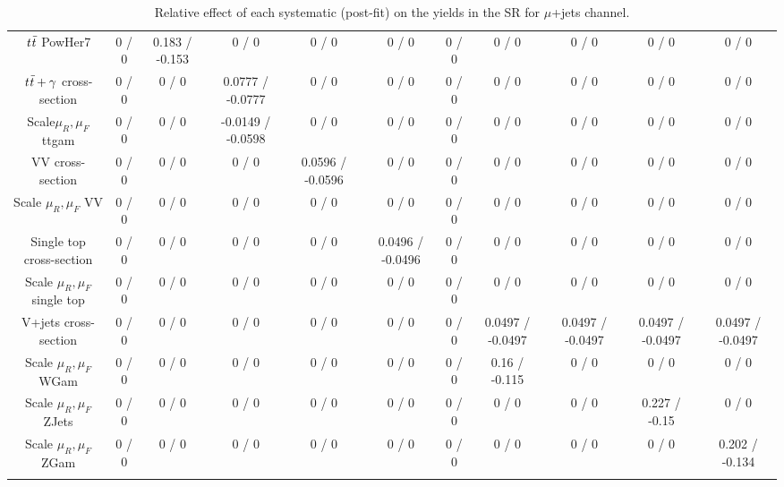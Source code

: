 {\begin{landscape}
\begin{longtable}{@{\extracolsep{\fill}}| *{11}{c|}}
 $ \it{t\bar{t}} $ PowHer7 & 0 / 0 & 0.183 / -0.153 & 0 / 0 & 0 / 0 & 0 / 0 & 0 / 0 & 0 / 0 & 0 / 0 & 0 / 0 & 0 / 0 \\ 
  $\it{t\bar{t}}+\gamma $ cross-section & 0 / 0 & 0 / 0 & 0.0777 / -0.0777 & 0 / 0 & 0 / 0 & 0 / 0 & 0 / 0 & 0 / 0 & 0 / 0 & 0 / 0 \\ 
  Scale$ \mu_{R},\mu_{F}$ ttgam & 0 / 0 & 0 / 0 & -0.0149 / -0.0598 & 0 / 0 & 0 / 0 & 0 / 0 & 0 / 0 & 0 / 0 & 0 / 0 & 0 / 0 \\ 
  VV cross-section & 0 / 0 & 0 / 0 & 0 / 0 & 0.0596 / -0.0596 & 0 / 0 & 0 / 0 & 0 / 0 & 0 / 0 & 0 / 0 & 0 / 0 \\ 
  Scale $\mu_{R},\mu_{F}$ VV & 0 / 0 & 0 / 0 & 0 / 0 & 0 / 0 & 0 / 0 & 0 / 0 & 0 / 0 & 0 / 0 & 0 / 0 & 0 / 0 \\ 
  Single top cross-section & 0 / 0 & 0 / 0 & 0 / 0 & 0 / 0 & 0.0496 / -0.0496 & 0 / 0 & 0 / 0 & 0 / 0 & 0 / 0 & 0 / 0 \\ 
  Scale $\mu_{R},\mu_{F}$ single top & 0 / 0 & 0 / 0 & 0 / 0 & 0 / 0 & 0 / 0 & 0 / 0 & 0 / 0 & 0 / 0 & 0 / 0 & 0 / 0 \\ 
  V+jets cross-section & 0 / 0 & 0 / 0 & 0 / 0 & 0 / 0 & 0 / 0 & 0 / 0 & 0.0497 / -0.0497 & 0.0497 / -0.0497 & 0.0497 / -0.0497 & 0.0497 / -0.0497 \\ 
  Scale $\mu_{R},\mu_{F}$ WGam & 0 / 0 & 0 / 0 & 0 / 0 & 0 / 0 & 0 / 0 & 0 / 0 & 0.16 / -0.115 & 0 / 0 & 0 / 0 & 0 / 0 \\ 
  Scale $\mu_{R},\mu_{F}$ ZJets & 0 / 0 & 0 / 0 & 0 / 0 & 0 / 0 & 0 / 0 & 0 / 0 & 0 / 0 & 0 / 0 & 0.227 / -0.15 & 0 / 0 \\ 
  Scale $\mu_{R},\mu_{F}$ ZGam & 0 / 0 & 0 / 0 & 0 / 0 & 0 / 0 & 0 / 0 & 0 / 0 & 0 / 0 & 0 / 0 & 0 / 0 & 0.202 / -0.134 \\ 
\hline 
\caption{Relative effect of each systematic (post-fit) on the yields in the SR for $\mu$+jets channel.} 
\label{tab:mujetsSyst}
\end{longtable} 
\end{landscape}
}